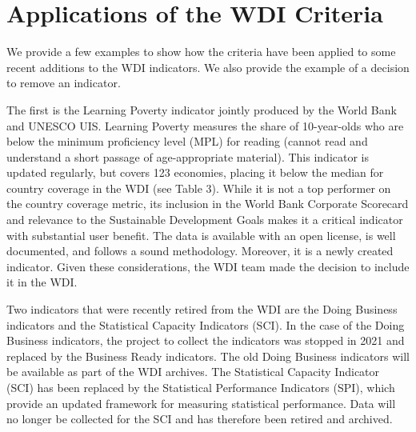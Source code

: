 \documentclass[
  11pt,
  a4paper,
  DIV=11,
  numbers=noendperiod]{scrreprt}
\begin{document}

\chapter{Applications of the WDI
Criteria}\label{applications-of-the-wdi-criteria}

We provide a few examples to show how the criteria have been applied to
some recent additions to the WDI indicators. We also provide the example
of a decision to remove an indicator.

The first is the Learning Poverty indicator jointly produced by the
World Bank and UNESCO UIS. Learning Poverty measures the share of
10-year-olds who are below the minimum proficiency level (MPL) for
reading (cannot read and understand a short passage of age-appropriate
material). {This indicator} is updated regularly, but {covers 123
economies}, placing it below the median for country coverage in the WDI
(see Table 3). While it is not a top performer on the country coverage
metric, its inclusion {in the World Bank Corporate Scorecard} and
relevance to the Sustainable Development Goals makes it a critical
indicator with substantial user benefit. The data is available with an
open license, is well documented, and follows a sound methodology.
Moreover, it is a newly created indicator. Given these considerations,
the WDI team made the decision to include it in the WDI.

Two indicators that were recently retired from the WDI are the Doing
Business indicators and the Statistical Capacity Indicators (SCI). In
the case of the Doing Business indicators, the project to collect the
indicators was stopped in 2021 and replaced by the Business Ready
indicators. The old Doing Business indicators will be available as part
of the WDI archives. The Statistical Capacity Indicator (SCI) has been
replaced by the Statistical Performance Indicators (SPI), which provide
an updated framework for measuring statistical performance. Data will no
longer be collected for the SCI and has therefore been retired and
archived.
\end{document}

